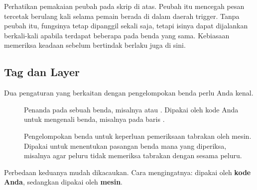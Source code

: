 \begin{catatabox}
Perhatikan pemakaian peubah  pada skrip di atas. Peubah
itu mencegah pesan tercetak berulang kali selama pemain berada di dalam daerah
trigger. Tanpa peubah itu, fungsinya tetap dipanggil sekali saja, tetapi isinya
dapat dijalankan berkali-kali apabila terdapat beberapa  pada
benda yang sama. Kebiasaan memeriksa keadaan sebelum bertindak berlaku juga di
sini.
\end{catatabox}

\subsection{Tag dan Layer}

Dua pengaturan yang berkaitan dengan pengelompokan benda perlu Anda kenal.

\begin{description}
  \item[] Penanda pada sebuah benda, misalnya  atau
        . Dipakai oleh kode Anda untuk mengenali benda, misalnya
        pada baris .
  \item[] Pengelompokan benda untuk keperluan pemeriksaan
        tabrakan oleh mesin. Dipakai untuk menentukan pasangan benda mana yang
        diperiksa, misalnya agar peluru tidak memeriksa tabrakan dengan sesama
        peluru.
\end{description}

Perbedaan keduanya mudah dikacaukan. Cara mengingatnya:  dipakai
oleh \textbf{kode Anda}, sedangkan  dipakai oleh
\textbf{mesin}.
